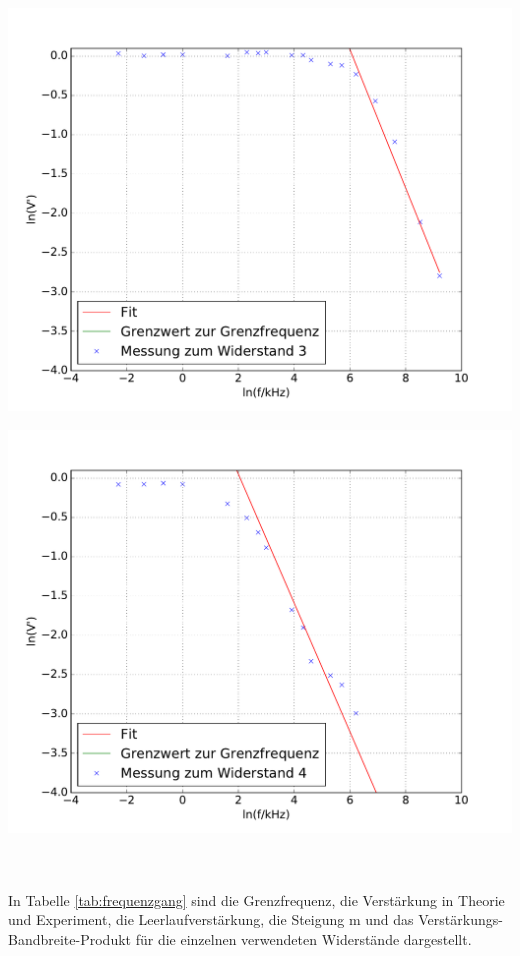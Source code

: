 \documentclass[]{scrartcl}
\begin{document}
\begin{minipage}[t]{0.5\textwidth}
	\includegraphics[width=\textwidth]{images/plot3.pdf}
\end{minipage}
\begin{minipage}[t]{0.5\textwidth}
	\includegraphics[width=\textwidth]{images/plot4.pdf}
	\label{fig:freq4}
\end{minipage} \\
\\
In Tabelle \ref{tab:frequenzgang} sind die Grenzfrequenz, die Verstärkung in Theorie und Experiment, die Leerlaufverstärkung, die Steigung m und das Verstärkungs-Bandbreite-Produkt für die einzelnen verwendeten Widerstände dargestellt. \\
\end{document}
